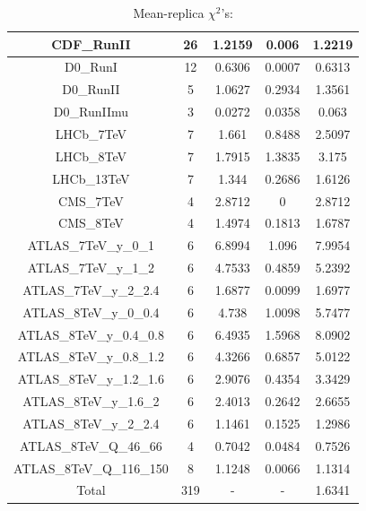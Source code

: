 \documentclass[
]{article}
\begin{document}
\begin{table}[h]
\begin{tabular}{|c|c|c|c|c|}
CDF\_RunII & 26 & 1.2159 & 0.006 & 1.2219 \\ \hline
D0\_RunI & 12 & 0.6306 & 0.0007 & 0.6313 \\ \hline
D0\_RunII & 5 & 1.0627 & 0.2934 & 1.3561 \\ \hline
D0\_RunIImu & 3 & 0.0272 & 0.0358 & 0.063 \\ \hline
LHCb\_7TeV & 7 & 1.661 & 0.8488 & 2.5097 \\ \hline
LHCb\_8TeV & 7 & 1.7915 & 1.3835 & 3.175 \\ \hline
LHCb\_13TeV & 7 & 1.344 & 0.2686 & 1.6126 \\ \hline
CMS\_7TeV & 4 & 2.8712 & 0 & 2.8712 \\ \hline
CMS\_8TeV & 4 & 1.4974 & 0.1813 & 1.6787 \\ \hline
ATLAS\_7TeV\_y\_0\_1 & 6 & 6.8994 & 1.096 & 7.9954 \\ \hline
ATLAS\_7TeV\_y\_1\_2 & 6 & 4.7533 & 0.4859 & 5.2392 \\ \hline
ATLAS\_7TeV\_y\_2\_2.4 & 6 & 1.6877 & 0.0099 & 1.6977 \\ \hline
ATLAS\_8TeV\_y\_0\_0.4 & 6 & 4.738 & 1.0098 & 5.7477 \\ \hline
ATLAS\_8TeV\_y\_0.4\_0.8 & 6 & 6.4935 & 1.5968 & 8.0902 \\ \hline
ATLAS\_8TeV\_y\_0.8\_1.2 & 6 & 4.3266 & 0.6857 & 5.0122 \\ \hline
ATLAS\_8TeV\_y\_1.2\_1.6 & 6 & 2.9076 & 0.4354 & 3.3429 \\ \hline
ATLAS\_8TeV\_y\_1.6\_2 & 6 & 2.4013 & 0.2642 & 2.6655 \\ \hline
ATLAS\_8TeV\_y\_2\_2.4 & 6 & 1.1461 & 0.1525 & 1.2986 \\ \hline
ATLAS\_8TeV\_Q\_46\_66 & 4 & 0.7042 & 0.0484 & 0.7526 \\ \hline
ATLAS\_8TeV\_Q\_116\_150 & 8 & 1.1248 & 0.0066 & 1.1314 \\ \hline
Total & 319 & - & - & 1.6341 \\ \hline

\end{tabular}

\caption{Mean-replica \(\chi^2\)'s:}

\end{table}
\end{document}

